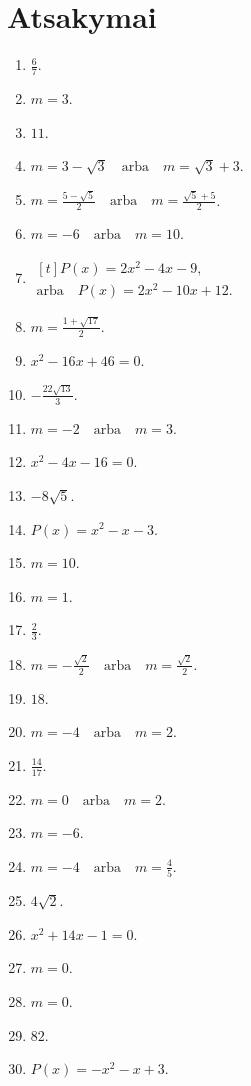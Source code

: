 \documentclass[11pt,a4paper]{article}
\begin{document}
\section*{Atsakymai}
\begingroup\small
\setlength{\baselineskip}{11pt}
\begin{enumerate}
\item \(\frac{6}{7}\).
\item \(m=3\).
\item \(11\).
\item \(m=3 - \sqrt{3}\quad\text{arba}\quad m=\sqrt{3} + 3\).
\item \(m=\frac{5 - \sqrt{5}}{2}\quad\text{arba}\quad m=\frac{\sqrt{5} + 5}{2}\).
\item \(m=-6\quad\text{arba}\quad m=10\).
\item \(\begin{aligned}[t]P(x)=2x^{2}-4x-9,\\\text{arba}\quad P(x)=2x^{2}-10x+12.\end{aligned}\)
\item \(m=\frac{1 + \sqrt{17}}{2}\).
\item \(x^{2}-16x+46=0\).
\item \(- \frac{22 \sqrt{13}}{3}\).
\item \(m=-2\quad\text{arba}\quad m=3\).
\item \(x^{2}-4x-16=0\).
\item \(- 8 \sqrt{5}\).
\item \(P(x)=x^{2}-x-3\).
\item \(m=10\).
\item \(m=1\).
\item \(\frac{2}{3}\).
\item \(m=- \frac{\sqrt{2}}{2}\quad\text{arba}\quad m=\frac{\sqrt{2}}{2}\).
\item \(18\).
\item \(m=-4\quad\text{arba}\quad m=2\).
\item \(\frac{14}{17}\).
\item \(m=0\quad\text{arba}\quad m=2\).
\item \(m=-6\).
\item \(m=-4\quad\text{arba}\quad m=\frac{4}{5}\).
\item \(4 \sqrt{2}\).
\item \(x^{2}+14x-1=0\).
\item \(m=0\).
\item \(m=0\).
\item \(82\).
\item \(P(x)=-x^{2}-x+3\).

\end{enumerate}
\end{document}
